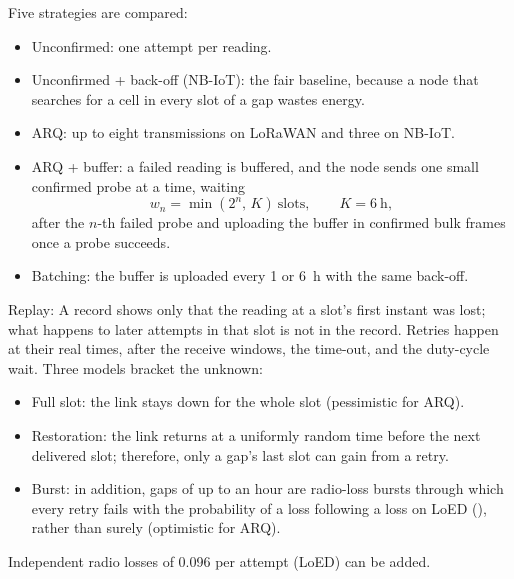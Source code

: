 Five strategies are compared:
\begin{itemize}
\item Unconfirmed: one attempt per reading.
\item Unconfirmed + back-off (NB-IoT): the fair baseline, because a node that searches for a cell in every slot of a gap wastes energy.
\item ARQ: up to eight transmissions on LoRaWAN and three on NB-IoT.
\item ARQ + buffer: a failed reading is buffered, and the node sends one small confirmed probe at a time, waiting
\begin{equation}
w_n=\min\left(2^{n},\,K\right)\ \text{slots},\qquad K=6~\text{h},
\label{eq:backoff}
\end{equation}
after the $n$-th failed probe and uploading the buffer in confirmed bulk frames once a probe succeeds.
\item Batching: the buffer is uploaded every 1 or 6~h with the same back-off.
\end{itemize}

Replay: A record shows only that the reading at a slot's first instant was lost; what happens to later attempts in that slot is not in the record. Retries happen at their real times, after the receive windows, the time-out, and the duty-cycle wait. Three models bracket the unknown:
\begin{itemize}
\item Full slot: the link stays down for the whole slot (pessimistic for ARQ).
\item Restoration: the link returns at a uniformly random time before the next delivered slot; therefore, only a gap's last slot can gain from a retry.
\item Burst: in addition, gaps of up to an hour are radio-loss bursts through which every retry fails with the probability of a loss following a loss on LoED (\loedCondLoss), rather than surely (optimistic for ARQ).
\end{itemize}
Independent radio losses of 0.096 per attempt (LoED) can be added.

